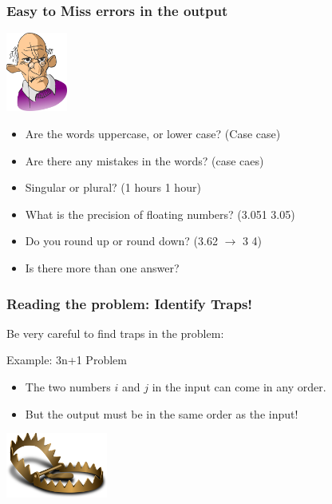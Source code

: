 \documentclass{beamer}
\begin{document}
\begin{frame}
  \frametitle{Easy to Miss errors in the output}

  \includegraphics[width=0.15\textwidth]{../img/angryclient}
  \begin{itemize}
  \item Are the words uppercase, or lower case? (Case  case)
  \item Are there any mistakes in the words? (case  caes)
  \item Singular or plural? (1 hours  1 hour)
  \item What is the precision of floating numbers? (3.051  3.05)
  \item Do you round up or round down? (3.62 $\rightarrow$ 3  4)
  \item Is there more than one answer?
  \end{itemize}
\end{frame}


\begin{frame}
  \frametitle{Reading the problem: Identify Traps!}

  Be very careful to find traps in the problem:

  \vfill
  
  \begin{block}{Example: 3n+1 Problem}
    \begin{itemize}
    \item The two numbers $i$ and $j$ in the input can come in any
      order.
    \item But the output must be in the same order as the input!
    \end{itemize}
  \end{block}
    
  \vfill

  \hfill \includegraphics[width=0.25\textwidth]{../img/trap}
\end{frame}
\end{document}
